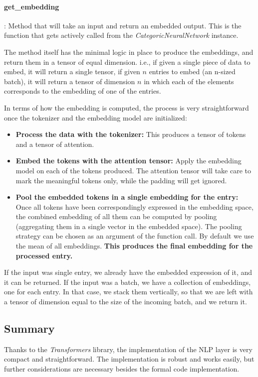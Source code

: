 \documentclass[a4paper, 11pt]{report}
\begin{document}
   \paragraph{get\_embedding}: Method that will take an input and return an embedded output. This is the function that gets actively called from the \textit{CategoricNeuralNetwork} instance.

   The method itself has the minimal logic in place to produce the embeddings, and return them in a tensor of equal dimension. i.e., if given a single piece of data to embed, it will return a single tensor, if given $n$ entries to embed (an n-sized batch), it will return a tensor of dimension $n$ in which each of the elements corresponds to the embedding of one of the entries.

   In terms of how the embedding is computed, the process is very straightforward once the tokenizer and the embedding model are initialized:

   \begin{itemize}
       \item \textbf{Process the data with the tokenizer:} This produces  a tensor of tokens and a tensor of attention.
       \item \textbf{Embed the tokens with the attention tensor:} Apply the embedding model on each of the tokens produced. The attention tensor will take care to mark the meaningful tokens only, while the padding will get ignored.
       \item \textbf{Pool the embedded tokens in a single embedding for the entry:} Once all tokens have been correspondingly expressed in the embedding space, the combined embedding of all them can be computed by pooling (aggregating them in a single vector in the embedded space). The pooling strategy can be chosen as an argument of the function call. By default we use the mean of all embeddings. \textbf{This produces the final embedding for the processed entry.}
   \end{itemize}
   If the input was single entry, we already have  the embedded expression of it, and it can be returned. If the input was a batch, we have a collection of embeddings, one for each entry. In that case, we stack them vertically, so that we are left with a tensor of dimension equal to the size of the incoming batch, and we return it.

    \subsection{Summary}
    Thanks to the \textit{Transformers} library, the implementation of the NLP layer is very compact and straightforward. The implementation is robust and works easily, but further considerations are necessary besides the formal code implementation.
\end{document}
